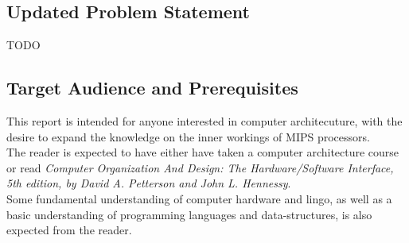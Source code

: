 


\subsection*{Updated Problem Statement}
TODO

\subsection*{Target Audience and Prerequisites}
This report is intended for anyone interested in computer architecuture, with
the desire to expand the knowledge on the inner workings of MIPS processors.\\
The reader is expected to have either have taken a computer architecture course
or read \textit{Computer Organization And Design: The Hardware/Software Interface, 5th
edition, by David A. Petterson and John L. Hennessy}.\\
Some fundamental understanding of computer hardware and lingo, as well as a basic
understanding of programming languages and data-structures, is also expected from the reader.
